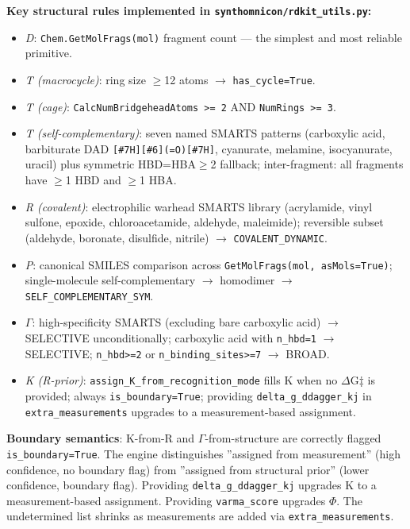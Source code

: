 \documentclass[12pt,a4paper]{article}
\begin{document}
\textbf{Key structural rules implemented in \texttt{synthomnicon/rdkit\_utils.py}:}

\begin{itemize}
    \item \emph{D}: \texttt{Chem.GetMolFrags(mol)} fragment count --- the simplest and most reliable primitive.
    \item \emph{T (macrocycle)}: ring size $\geq$12 atoms $\rightarrow$ \texttt{has\_cycle=True}.
    \item \emph{T (cage)}: \texttt{CalcNumBridgeheadAtoms \textgreater{}= 2} AND \texttt{NumRings \textgreater{}= 3}.
    \item \emph{T (self-complementary)}: seven named SMARTS patterns (carboxylic acid, barbiturate DAD \texttt{{[}\#7H{]}{[}\#6{]}(=O){[}\#7H{]}}, cyanurate, melamine, isocyanurate, uracil) plus symmetric HBD=HBA$\geq$2 fallback; inter-fragment: all fragments have $\geq$1 HBD and $\geq$1 HBA.
    \item \emph{R (covalent)}: electrophilic warhead SMARTS library (acrylamide, vinyl sulfone, epoxide, chloroacetamide, aldehyde, maleimide); reversible subset (aldehyde, boronate, disulfide, nitrile) $\rightarrow$ \texttt{COVALENT\_DYNAMIC}.
    \item \emph{P}: canonical SMILES comparison across \texttt{GetMolFrags(mol, asMols=True)}; single-molecule self-complementary $\rightarrow$ homodimer $\rightarrow$ \texttt{SELF\_COMPLEMENTARY\_SYM}.
    \item \emph{$\Gamma$}: high-specificity SMARTS (excluding bare carboxylic acid) $\rightarrow$ SELECTIVE unconditionally; carboxylic acid with \texttt{n\_hbd=1} $\rightarrow$ SELECTIVE; \texttt{n\_hbd\textgreater{}=2} or \texttt{n\_binding\_sites\textgreater{}=7} $\rightarrow$ BROAD.
    \item \emph{K (R-prior)}: \texttt{assign\_K\_from\_recognition\_mode} fills K when no $\Delta$G‡ is provided; always \texttt{is\_boundary=True}; providing \texttt{delta\_g\_ddagger\_kj} in \texttt{extra\_measurements} upgrades to a measurement-based assignment.
\end{itemize}

\textbf{Boundary semantics}: K-from-R and $\Gamma$-from-structure are correctly flagged \texttt{is\_boundary=True}. The engine distinguishes ''assigned from measurement'' (high confidence, no boundary flag) from ''assigned from structural prior'' (lower confidence, boundary flag). Providing \texttt{delta\_g\_ddagger\_kj} upgrades K to a measurement-based assignment. Providing \texttt{varma\_score} upgrades $\Phi$. The undetermined list shrinks as measurements are added via \texttt{extra\_measurements}.
\end{document}

